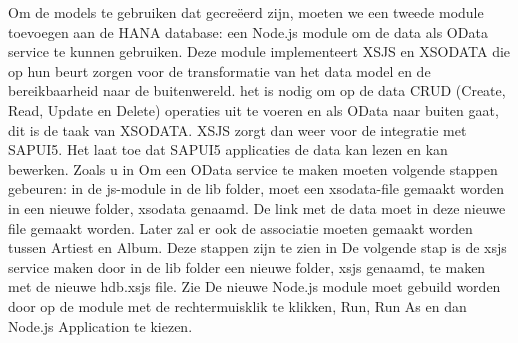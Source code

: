     Om de models te gebruiken dat gecreëerd zijn, moeten we een tweede module toevoegen aan de HANA database: een Node.js module om de data als OData service te kunnen gebruiken.
    Deze module implementeert XSJS en XSODATA die op hun beurt zorgen voor de transformatie van het data model en de bereikbaarheid naar de buitenwereld. het is nodig om op de data CRUD (Create, Read, Update en Delete) operaties uit te voeren en als OData naar buiten gaat, dit is de taak van XSODATA. XSJS zorgt dan weer voor de integratie met SAPUI5. Het laat toe dat SAPUI5 applicaties de data kan lezen en kan bewerken.
    Zoals u in %
    Om een OData service te maken moeten volgende stappen gebeuren: in de js-module in de lib folder, moet een xsodata-file gemaakt worden in een nieuwe folder, xsodata genaamd. De link met de data moet in deze nieuwe file gemaakt worden. Later zal er ook de associatie moeten gemaakt worden tussen Artiest en Album. Deze stappen zijn te zien in %
    De volgende stap is de xsjs service maken door in de lib folder een nieuwe folder, xsjs genaamd, te maken met de nieuwe hdb.xsjs file. Zie %
    De nieuwe Node.js module moet gebuild worden door op de module met de rechtermuisklik te klikken, Run, Run As en dan Node.js Application te kiezen.
    
    
     
    
    
    
    
    
    
    
    